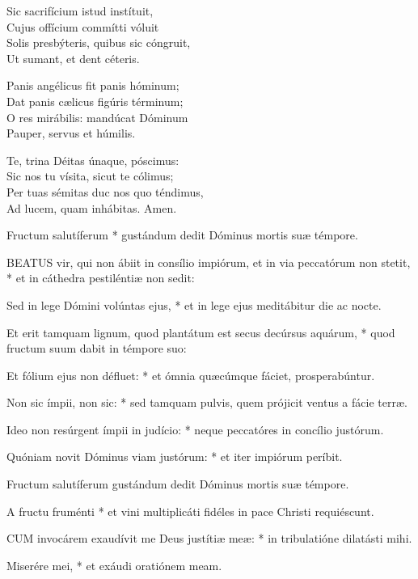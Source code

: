 Sic sacrifícium istud instítuit,\\
Cujus offícium commítti vóluit\\
Solis presbýteris, quibus sic cóngruit,\\
Ut sumant, et dent céteris.

Panis angélicus fit panis hóminum;\\
Dat panis cælicus figúris términum;\\
O res mirábilis: mandúcat Dóminum\\
Pauper, servus et húmilis.

Te, trina Déitas únaque, póscimus:\\
Sic nos tu vísita, sicut te cólimus;\\
Per tuas sémitas duc nos quo téndimus,\\
Ad lucem, quam inhábitas. Amen.


 Fructum salutíferum * gustándum dedit Dóminus mortis suæ témpore.


\lettrine[lines=2]{B}{EATUS} vir, qui non ábiit in consílio impiórum, et in via peccatórum non stetit, * et in cáthedra pestiléntiæ non sedit:

Sed in lege Dómini volúntas ejus, * et in lege ejus meditábitur die ac nocte.

Et erit tamquam lignum, quod plantátum est secus decúrsus aquárum, * quod fructum suum dabit in témpore suo:

Et fólium ejus non défluet: * et ómnia quæcúmque fáciet, prosperabúntur.

Non sic ímpii, non sic: * sed tamquam pulvis, quem prójicit ventus a fácie terræ.

Ideo non resúrgent ímpii in judício: * neque peccatóres in concílio justórum.

Quóniam novit Dóminus viam justórum: * et iter impiórum períbit.

 Fructum salutíferum gustándum dedit Dóminus mortis suæ témpore.

 A fructu fruménti * et vini multiplicáti fidéles in pace Christi requiéscunt.


\lettrine[lines=2]{C}{UM} invocárem exaudívit me Deus justítiæ meæ: * in tribulatióne dilatásti mihi.

Miserére mei, * et exáudi oratiónem meam.

